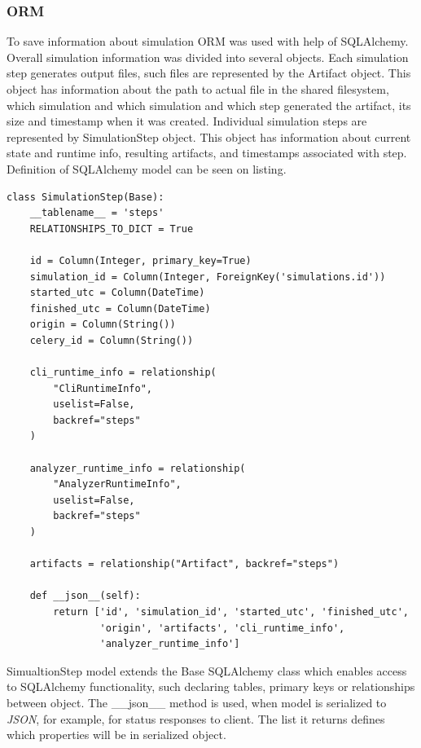 \subsubsection{ORM}
To save information about simulation ORM was used with help of SQLAlchemy. Overall simulation information was divided into several objects. Each simulation step generates output files, such files are represented by the Artifact object. This object has information about the path to actual file in the shared filesystem, which simulation and which simulation and which step generated the artifact, its size and timestamp when it was created. Individual simulation steps are represented by SimulationStep object. This object has information about current state and runtime info, resulting artifacts, and timestamps associated with step. Definition of SQLAlchemy model can be seen on listing.
\begin{lstlisting}[label=list:sp-sqlalchemy,caption=SimulationStep SQLAlchemy model, basicstyle=\footnotesize\ttfamily]
class SimulationStep(Base):
    __tablename__ = 'steps'
    RELATIONSHIPS_TO_DICT = True

    id = Column(Integer, primary_key=True)
    simulation_id = Column(Integer, ForeignKey('simulations.id'))
    started_utc = Column(DateTime)
    finished_utc = Column(DateTime)
    origin = Column(String())
    celery_id = Column(String())
  
    cli_runtime_info = relationship(
        "CliRuntimeInfo", 
        uselist=False, 
        backref="steps"
    )
  
    analyzer_runtime_info = relationship(
        "AnalyzerRuntimeInfo", 
        uselist=False,
        backref="steps"
    )
  
    artifacts = relationship("Artifact", backref="steps")
    
    def __json__(self):
        return ['id', 'simulation_id', 'started_utc', 'finished_utc',
                'origin', 'artifacts', 'cli_runtime_info',
                'analyzer_runtime_info']
\end{lstlisting}
SimualtionStep model extends the Base SQLAlchemy class which enables access to SQLAlchemy functionality, such declaring tables, primary keys or relationships between object. The \_\_json\_\_ method is used, when model is serialized to \textit{JSON}, for example, for status responses to client. The list it returns defines which properties will be in serialized object. 
